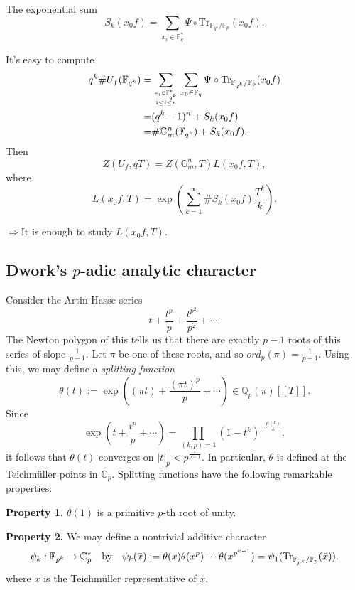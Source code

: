 \documentclass[a4paper,oneside,11pt]{article}
\theoremstyle{plain} \theoremstyle{definition}
\theoremstyle{remark}
\def\bb #1{ {\mathbb #1} }
\newcommand{\f}{\mathbb{F}}
\begin{document}
 The exponential sum
 $$S_k(x_0f)=\sum_{x_i\in \f_q^*} \Psi\circ
 \text{Tr}_{\f_{q^k}/{\f_p}}(x_0f).$$

 It's easy to compute $$\aligned q^k\#U_f(\f_{q^k})=
 &\sum_{{x_i\in \f_{q^k}^*}\atop {1\le i\le n}}\sum_{x_0\in\f_q}\Psi\circ
 \text{Tr}_{\f_{q^k}/{\f_p}}(x_0f)\\
 =&(q^k-1)^n+S_k(x_0f)\\ =&
 \#\mathbb{G}_m^n(\f_{q^k})+S_k(x_0f).\endaligned$$
 Then $$Z(U_f,qT)=Z(\mathbb{G}_m^n,T)L(x_0f,T),$$
 where
 $$L(x_0f,T)=\exp(\sum_{k=1}^\infty\#S_k(x_0f)\frac{T^k}{k}).$$

 $\Rightarrow $It is enough to study $L(x_0f,T)$.

\subsection{Dwork's $p$-adic analytic character}
Consider the Artin-Hasse series
\[
t + \frac{t^p}{p} + \frac{t^{p^2}}{p^2} + \cdots.
\]
The Newton polygon of this tells us that there are exactly $p-1$
roots of this series of slope $\frac{1}{p-1}$. Let $\pi$ be one of
these roots, and so $ord_p(\pi) = \frac{1}{p-1}$. Using this, we
may define a \emph{splitting function}
\[
\theta(t):=\exp\left((\pi t) + \frac{(\pi t)^p}{p} + \cdots
\right) \in \bb Q_p(\pi)[[T]].
\]
Since
\[
\exp\left(t + \frac{t^p}{p} + \cdots\right) =
\prod_{(k,p)=1}(1-t^k)^{-\frac{\mu(k)}{k}},
\]
it follows that $\theta(t)$ converges on $|t|_p <
p^{\frac{1}{p-1}}$. In particular, $\theta$ is defined at the
Teichm\"uller points in $\bb C_p$. Splitting functions have the
following remarkable properties:

{\bf Property 1.} $\theta(1)$ is a primitive $p$-th root of unity.

{\bf Property 2.} We may define a nontrivial additive character
\[
\psi_k: \bb F_{p^k} \rightarrow \bb C_p^* \quad \text{by} \quad
\psi_k(\bar x) := \theta(x) \theta(x^p) \cdots
\theta(x^{p^{k-1}}) = \psi_1 ({\rm Tr}_{\bb F_{p^k}/\bb F_p}(\bar x)).
\]
where $x$ is the Teichm\"uller representative of $\bar x$.
\end{document}

